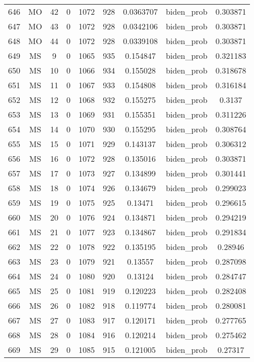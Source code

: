 \documentclass[12pt,a4paper]{article}
\begin{document}
\begin{tabular}{r|cccccccc}
	646 & MO & 42 & 0 & 1072 & 928 & 0.0363707 & biden\_prob & 0.303871 \\
	647 & MO & 43 & 0 & 1072 & 928 & 0.0342106 & biden\_prob & 0.303871 \\
	648 & MO & 44 & 0 & 1072 & 928 & 0.0339108 & biden\_prob & 0.303871 \\
	649 & MS & 9 & 0 & 1065 & 935 & 0.154847 & biden\_prob & 0.321183 \\
	650 & MS & 10 & 0 & 1066 & 934 & 0.155028 & biden\_prob & 0.318678 \\
	651 & MS & 11 & 0 & 1067 & 933 & 0.154808 & biden\_prob & 0.316184 \\
	652 & MS & 12 & 0 & 1068 & 932 & 0.155275 & biden\_prob & 0.3137 \\
	653 & MS & 13 & 0 & 1069 & 931 & 0.155351 & biden\_prob & 0.311226 \\
	654 & MS & 14 & 0 & 1070 & 930 & 0.155295 & biden\_prob & 0.308764 \\
	655 & MS & 15 & 0 & 1071 & 929 & 0.143137 & biden\_prob & 0.306312 \\
	656 & MS & 16 & 0 & 1072 & 928 & 0.135016 & biden\_prob & 0.303871 \\
	657 & MS & 17 & 0 & 1073 & 927 & 0.134899 & biden\_prob & 0.301441 \\
	658 & MS & 18 & 0 & 1074 & 926 & 0.134679 & biden\_prob & 0.299023 \\
	659 & MS & 19 & 0 & 1075 & 925 & 0.13471 & biden\_prob & 0.296615 \\
	660 & MS & 20 & 0 & 1076 & 924 & 0.134871 & biden\_prob & 0.294219 \\
	661 & MS & 21 & 0 & 1077 & 923 & 0.134867 & biden\_prob & 0.291834 \\
	662 & MS & 22 & 0 & 1078 & 922 & 0.135195 & biden\_prob & 0.28946 \\
	663 & MS & 23 & 0 & 1079 & 921 & 0.13557 & biden\_prob & 0.287098 \\
	664 & MS & 24 & 0 & 1080 & 920 & 0.13124 & biden\_prob & 0.284747 \\
	665 & MS & 25 & 0 & 1081 & 919 & 0.120223 & biden\_prob & 0.282408 \\
	666 & MS & 26 & 0 & 1082 & 918 & 0.119774 & biden\_prob & 0.280081 \\
	667 & MS & 27 & 0 & 1083 & 917 & 0.120171 & biden\_prob & 0.277765 \\
	668 & MS & 28 & 0 & 1084 & 916 & 0.120214 & biden\_prob & 0.275462 \\
	669 & MS & 29 & 0 & 1085 & 915 & 0.121005 & biden\_prob & 0.27317 \\

\end{tabular}
\end{document}
